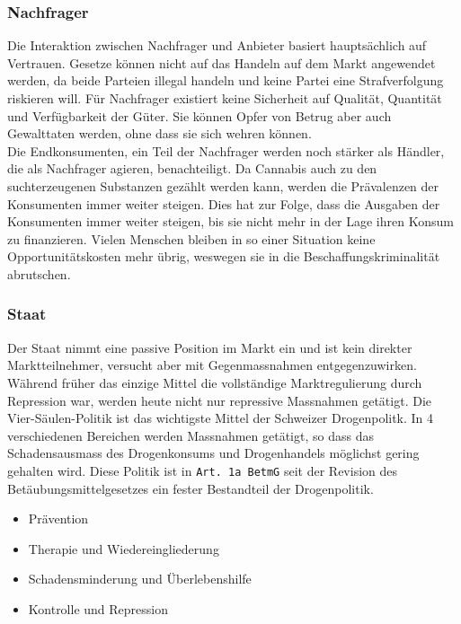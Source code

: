 \documentclass[../main.tex]{subfiles}
\begin{document}
	
	\subsubsection{Nachfrager}
	Die Interaktion zwischen Nachfrager und Anbieter basiert hauptsächlich auf Vertrauen.
	Gesetze können nicht auf das Handeln auf dem Markt angewendet werden, da beide Parteien illegal handeln und keine Partei eine Strafverfolgung riskieren will.
	Für Nachfrager existiert keine Sicherheit auf Qualität, Quantität und Verfügbarkeit der Güter.
	Sie können Opfer von Betrug aber auch Gewalttaten werden, ohne dass sie sich wehren können.\\
	
	\noindent	
	Die Endkonsumenten, ein Teil der Nachfrager werden noch stärker als Händler, die als Nachfrager agieren, benachteiligt.
	Da Cannabis auch zu den suchterzeugenen Substanzen gezählt werden kann, werden die Prävalenzen der Konsumenten immer weiter steigen.
	Dies hat zur Folge, dass die Ausgaben der Konsumenten immer weiter steigen, bis sie nicht mehr in der Lage ihren Konsum zu finanzieren.
	Vielen Menschen bleiben in so einer Situation keine Opportunitätskosten mehr übrig, weswegen sie in die Beschaffungskriminalität abrutschen.
	
	
	
	\subsubsection{Staat}
	Der Staat nimmt eine passive Position im Markt ein und ist kein direkter Marktteilnehmer, versucht aber mit Gegenmassnahmen entgegenzuwirken.
	Während früher das einzige Mittel die vollständige Marktregulierung durch Repression war, werden heute nicht nur repressive Massnahmen getätigt.
	Die Vier-Säulen-Politik ist das wichtigste Mittel der Schweizer Drogenpolitk. 
	In 4 verschiedenen Bereichen werden Massnahmen getätigt, so dass das Schadensausmass des Drogenkonsums und Drogenhandels möglichst gering gehalten wird.
	Diese Politik ist in \texttt{Art. 1a BetmG} seit der Revision des Betäubungsmittelgesetzes ein fester Bestandteil der Drogenpolitik.
	\begin{itemize}
		\item Prävention
		\item Therapie und Wiedereingliederung
		\item Schadensminderung und Überlebenshilfe
		\item Kontrolle und Repression
	\end{itemize}
	
\end{document}
